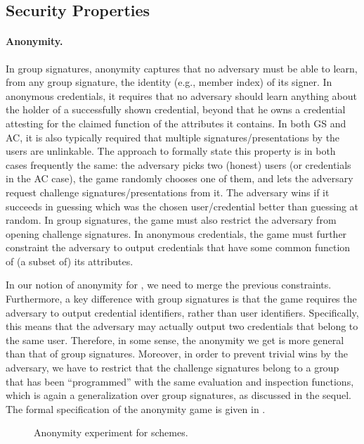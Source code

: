\subsection{Security Properties}
\label{ssec:security}

\paragraph{Anonymity.} %
In group signatures, anonymity captures that no adversary must be able to learn,
from any group signature, the identity (e.g., member index) of its signer. In 
anonymous credentials, it requires that no adversary should learn anything about
the holder of a successfully shown credential, beyond that he owns a credential
attesting for the claimed function of the attributes it contains. In both GS and
AC, it is also typically required that
multiple signatures/presentations by the users are unlinkable. The approach to
formally state this property is in both cases frequently the same: the adversary
picks two (honest) users (or credentials in the AC case), the game randomly
chooses one of them, and lets the adversary request challenge
signatures/presentations from it. The adversary wins if it succeeds in guessing
which was the chosen user/credential better than guessing at random. In group
signatures, the game must also restrict the adversary from opening challenge
signatures. In anonymous credentials, the game must further constraint the
adversary to output credentials that have some common function of (a subset of)
its attributes.

In our notion of anonymity for \UAS, we need to merge the previous constraints.
Furthermore, a key difference with group signatures is that the game requires
the adversary to output credential identifiers, rather than user identifiers.
Specifically, this means that the adversary may actually output two credentials
that belong to the same user. Therefore, in some sense, the anonymity we get is
more general than that of group signatures. Moreover, in order to prevent
trivial wins by the adversary, we have to restrict that the challenge signatures
belong to a group that has been ``programmed'' with the same evaluation and
inspection functions, which is again a generalization over group signatures,
as discussed in the sequel. The formal specification of the anonymity game is
given in . 

\begin{figure}[htp!]
  \caption{Anonymity experiment for \UAS schemes.}
  \label{fig:exp-uas-anonb}
\end{figure}

